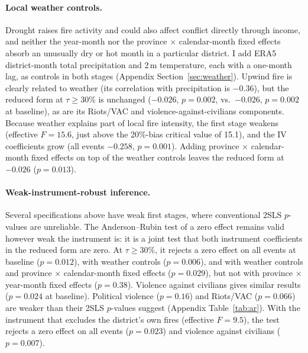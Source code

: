 \documentclass[12pt]{article}
\begin{document}
\paragraph{Local weather controls.} Drought raises fire activity and could also affect conflict directly through income, and neither the year-month nor the province $\times$ calendar-month fixed effects absorb an unusually dry or hot month in a particular district. I add ERA5 district-month total precipitation and 2\,m temperature, each with a one-month lag, as controls in both stages (Appendix Section~\ref{sec:weather}). Upwind fire is clearly related to weather (its correlation with precipitation is $-0.36$), but the reduced form at $\tau \geq 30\%$ is unchanged ($-0.026$, $p=0.002$, vs.\ $-0.026$, $p=0.002$ at baseline), as are its Riots/VAC and violence-against-civilians components. Because weather explains part of local fire intensity, the first stage weakens (effective $F = 15.6$, just above the 20\%-bias critical value of 15.1), and the IV coefficients grow (all events $-0.258$, $p=0.001$). Adding province $\times$ calendar-month fixed effects on top of the weather controls leaves the reduced form at $-0.026$ ($p=0.013$).

\paragraph{Weak-instrument-robust inference.} Several specifications above have weak first stages, where conventional 2SLS $p$-values are unreliable. The Anderson--Rubin test of a zero effect remains valid however weak the instrument is: it is a joint test that both instrument coefficients in the reduced form are zero. At $\tau \geq 30\%$, it rejects a zero effect on all events at baseline ($p=0.012$), with weather controls ($p=0.006$), and with weather controls and province $\times$ calendar-month fixed effects ($p=0.029$), but not with province $\times$ year-month fixed effects ($p=0.38$). Violence against civilians gives similar results ($p=0.024$ at baseline). Political violence ($p=0.16$) and Riots/VAC ($p=0.066$) are weaker than their 2SLS $p$-values suggest (Appendix Table~\ref{tab:ar}). With the instrument that excludes the district's own fires (effective $F = 9.5$), the test rejects a zero effect on all events ($p=0.023$) and violence against civilians ($p=0.007$).
\end{document}
